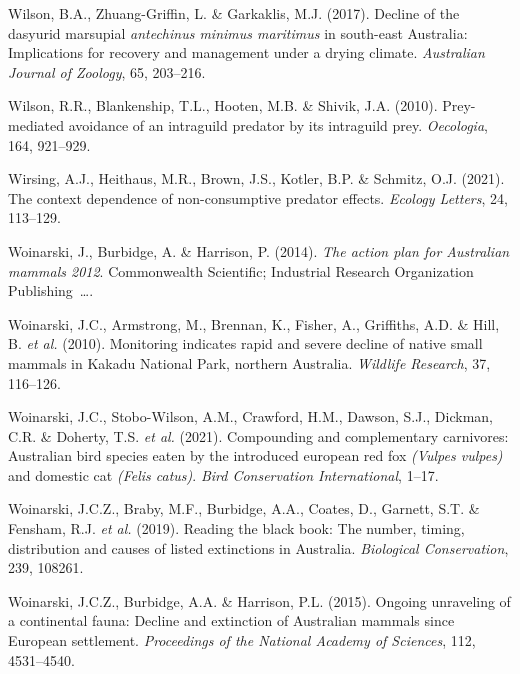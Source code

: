 \documentclass[11pt,a4paper,titlepage,twoside,openright]{style/unimelbthesis}
\begin{document}
\begin{mainmatter}
\leavevmode\hypertarget{ref-wilson2017decline}{}%
Wilson, B.A., Zhuang-Griffin, L. \& Garkaklis, M.J. (2017). Decline of the dasyurid marsupial \emph{antechinus minimus maritimus} in south-east Australia: Implications for recovery and management under a drying climate. \emph{Australian Journal of Zoology}, 65, 203--216.

\leavevmode\hypertarget{ref-wilson2010prey}{}%
Wilson, R.R., Blankenship, T.L., Hooten, M.B. \& Shivik, J.A. (2010). Prey-mediated avoidance of an intraguild predator by its intraguild prey. \emph{Oecologia}, 164, 921--929.

\leavevmode\hypertarget{ref-wirsing2021context}{}%
Wirsing, A.J., Heithaus, M.R., Brown, J.S., Kotler, B.P. \& Schmitz, O.J. (2021). The context dependence of non-consumptive predator effects. \emph{Ecology Letters}, 24, 113--129.

\leavevmode\hypertarget{ref-woinarski2014action}{}%
Woinarski, J., Burbidge, A. \& Harrison, P. (2014). \emph{The action plan for Australian mammals 2012}. Commonwealth Scientific; Industrial Research Organization Publishing~\ldots.

\leavevmode\hypertarget{ref-woinarski2010monitoring}{}%
Woinarski, J.C., Armstrong, M., Brennan, K., Fisher, A., Griffiths, A.D. \& Hill, B. \emph{et al.} (2010). Monitoring indicates rapid and severe decline of native small mammals in Kakadu National Park, northern Australia. \emph{Wildlife Research}, 37, 116--126.

\leavevmode\hypertarget{ref-woinarski2021compounding}{}%
Woinarski, J.C., Stobo-Wilson, A.M., Crawford, H.M., Dawson, S.J., Dickman, C.R. \& Doherty, T.S. \emph{et al.} (2021). Compounding and complementary carnivores: Australian bird species eaten by the introduced european red fox \emph{(Vulpes vulpes)} and domestic cat \emph{(Felis catus)}. \emph{Bird Conservation International}, 1--17.

\leavevmode\hypertarget{ref-woinarski2019reading}{}%
Woinarski, J.C.Z., Braby, M.F., Burbidge, A.A., Coates, D., Garnett, S.T. \& Fensham, R.J. \emph{et al.} (2019). Reading the black book: The number, timing, distribution and causes of listed extinctions in Australia. \emph{Biological Conservation}, 239, 108261.

\leavevmode\hypertarget{ref-woinarski2015ongoing}{}%
Woinarski, J.C.Z., Burbidge, A.A. \& Harrison, P.L. (2015). Ongoing unraveling of a continental fauna: Decline and extinction of Australian mammals since European settlement. \emph{Proceedings of the National Academy of Sciences}, 112, 4531--4540.


\end{mainmatter}
\end{document}
